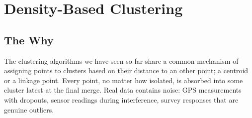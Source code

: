 


\chapter{Density-Based Clustering}


\section{The Why}

The clustering algorithms we have seen so far share a common mechanism of assigning points to clusters based on their distance 
to an other point; a centroid or a linkage point.
Every point, no matter how isolated, is absorbed into some cluster latest at the final merge.
Real data contains noise: GPS measurements with dropouts, sensor readings during interference, 
survey responses that are genuine outliers.


